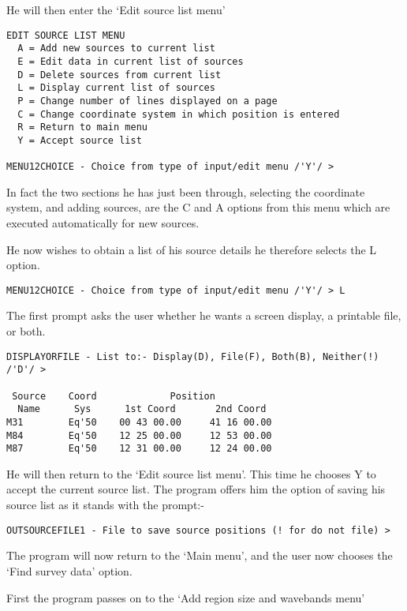 \documentclass[twoside,11pt]{article}
\begin{document}
He will then enter the `Edit source list menu'

\begin{verbatim}
EDIT SOURCE LIST MENU
  A = Add new sources to current list
  E = Edit data in current list of sources
  D = Delete sources from current list
  L = Display current list of sources
  P = Change number of lines displayed on a page
  C = Change coordinate system in which position is entered
  R = Return to main menu
  Y = Accept source list

MENU12CHOICE - Choice from type of input/edit menu /'Y'/ > 
\end{verbatim}

In fact the two sections he has just been through, selecting the coordinate
system, and adding sources, are the C and A options from this menu which are
executed automatically for new sources.

He now wishes to obtain a list of his source details he therefore selects
the L option.

\begin{verbatim}
MENU12CHOICE - Choice from type of input/edit menu /'Y'/ > L
\end{verbatim}

The first prompt asks the user whether he wants a screen display, a printable
file, or both.

\begin{verbatim}
DISPLAYORFILE - List to:- Display(D), File(F), Both(B), Neither(!) /'D'/ > 

 Source    Coord             Position
  Name      Sys      1st Coord       2nd Coord
M31        Eq'50    00 43 00.00     41 16 00.00
M84        Eq'50    12 25 00.00     12 53 00.00
M87        Eq'50    12 31 00.00     12 24 00.00
\end{verbatim}

He will then return to the `Edit source list menu'. This time he chooses
Y to accept the current source list. The program offers him the option
of saving his source list as it stands with the prompt:-

\begin{verbatim}
OUTSOURCEFILE1 - File to save source positions (! for do not file) > 
\end{verbatim}

The program will now return to the `Main menu', and the user now chooses
the `Find survey data' option. 

First the program passes on to the `Add region size and wavebands menu'
\end{document}
